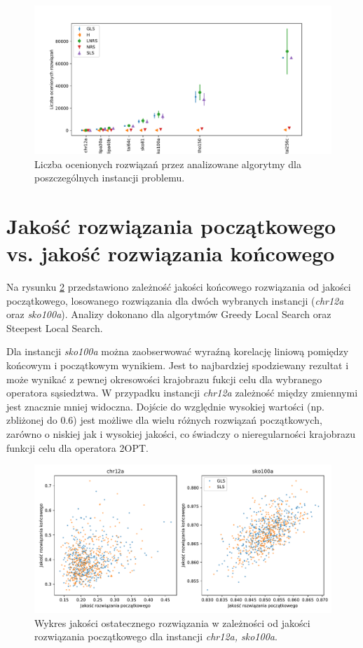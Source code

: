 \documentclass{article}
\begin{document}
\begin{figure}[H]
	\centering
	\includegraphics[width=\linewidth]{figs/num_obj_val_calls.pdf}
	\caption{Liczba ocenionych rozwiązań przez analizowane algorytmy dla poszczególnych instancji problemu.}
	\label{fig:num_obj_val_calls}
\end{figure}

\section{Jakość rozwiązania początkowego vs. jakość rozwiązania końcowego}
Na rysunku \ref{fig:quality_start_vs_quality} przedstawiono zależność jakości końcowego rozwiązania od jakości początkowego, losowanego rozwiązania dla dwóch wybranych instancji (\textit{chr12a} oraz \textit{sko100a}). Analizy dokonano dla algorytmów Greedy Local Search oraz Steepest Local Search.
\par Dla instancji \textit{sko100a} można zaobserwować wyraźną korelację liniową pomiędzy końcowym i początkowym wynikiem. Jest to najbardziej spodziewany rezultat i może wynikać z pewnej okresowości krajobrazu fukcji celu dla wybranego operatora sąsiedztwa. W przypadku instancji \textit{chr12a} zależność między zmiennymi jest znacznie mniej widoczna. Dojście do względnie wysokiej wartości (np. zbliżonej do 0.6) jest możliwe dla wielu różnych rozwiązań początkowych, zarówno o niskiej jak i wysokiej jakości, co świadczy o nieregularności krajobrazu funkcji celu dla operatora 2OPT.
\begin{figure}[H]
	\centering
	\includegraphics[width=\linewidth]{figs/quality_start_vs_quality.pdf}
	\caption{Wykres jakości ostatecznego rozwiązania w zależności od jakości rozwiązania początkowego dla instancji \textit{chr12a, sko100a}.}
	\label{fig:quality_start_vs_quality}
\end{figure}
\end{document}
